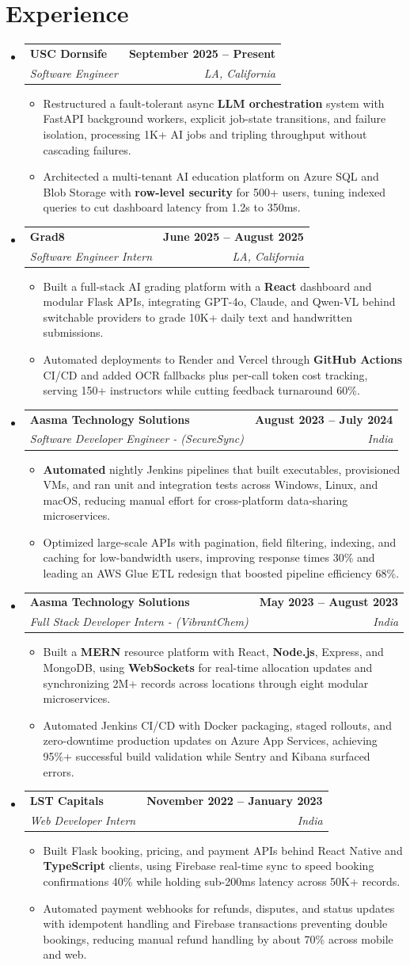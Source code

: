 \documentclass[letterpaper,10pt]{article}
\makeatletter
\newcommand{\itemTail}{\vspace{-4pt}}
\newcommand{\sectionGap}{\vspace{-8pt}}
\newcommand{\roleGap}{\vspace{2pt}}
\newcommand{\resumeItem}[1]{\item\small{{#1 \itemTail}}}
\newcommand{\resumeSubheading}[4]{\vspace{-1pt}\item\begin{tabular*}{1.0\textwidth}[t]{l@{\extracolsep{\fill}}r}\textbf{#1} & \textbf{\small #2} \\\textit{\small#3} & \textit{\small #4} \\\end{tabular*}\vspace{-2pt}}
\newcommand{\resumeSubHeadingListStart}{\begin{itemize}[leftmargin=0.0in, label={}]}
\newcommand{\resumeSubHeadingListEnd}{\end{itemize}}
\newcommand{\resumeItemListStart}{\begin{itemize}[leftmargin=0.15in,label=\textbullet,itemsep=3pt,topsep=0pt,parsep=0pt,partopsep=0pt]}
\newcommand{\resumeItemListEnd}{\end{itemize}\vspace{-4pt}}
\makeatother
\begin{document}
\section{Experience}
\resumeSubHeadingListStart
\resumeSubheading{USC Dornsife}{September 2025 -- Present}{Software Engineer}{LA, California}
\resumeItemListStart
\resumeItem{Restructured a fault-tolerant async \textbf{LLM orchestration} system with FastAPI background workers, explicit job-state transitions, and failure isolation, processing 1K+ AI jobs and tripling throughput without cascading failures.}
\resumeItem{Architected a multi-tenant AI education platform on Azure SQL and Blob Storage with \textbf{row-level security} for 500+ users, tuning indexed queries to cut dashboard latency from 1.2s to 350ms.}
\resumeItemListEnd
\roleGap
\resumeSubheading{Grad8}{June 2025 -- August 2025}{Software Engineer Intern}{LA, California}
\resumeItemListStart
\resumeItem{Built a full-stack AI grading platform with a \textbf{React} dashboard and modular Flask APIs, integrating GPT-4o, Claude, and Qwen-VL behind switchable providers to grade 10K+ daily text and handwritten submissions.}
\resumeItem{Automated deployments to Render and Vercel through \textbf{GitHub Actions} CI/CD and added OCR fallbacks plus per-call token cost tracking, serving 150+ instructors while cutting feedback turnaround 60\%.}
\resumeItemListEnd
\roleGap
\resumeSubheading{Aasma Technology Solutions}{August 2023 -- July 2024}{Software Developer Engineer - (SecureSync)}{India}
\resumeItemListStart
\resumeItem{\textbf{Automated} nightly Jenkins pipelines that built executables, provisioned VMs, and ran unit and integration tests across Windows, Linux, and macOS, reducing manual effort for cross-platform data-sharing microservices.}
\resumeItem{Optimized large-scale APIs with pagination, field filtering, indexing, and caching for low-bandwidth users, improving response times 30\% and leading an AWS Glue ETL redesign that boosted pipeline efficiency 68\%.}
\resumeItemListEnd
\roleGap
\resumeSubheading{Aasma Technology Solutions}{May 2023 -- August 2023}{Full Stack Developer Intern - (VibrantChem)}{India}
\resumeItemListStart
\resumeItem{Built a \textbf{MERN} resource platform with React, \textbf{Node.js}, Express, and MongoDB, using \textbf{WebSockets} for real-time allocation updates and synchronizing 2M+ records across locations through eight modular microservices.}
\resumeItem{Automated Jenkins CI/CD with Docker packaging, staged rollouts, and zero-downtime production updates on Azure App Services, achieving 95\%+ successful build validation while Sentry and Kibana surfaced errors.}
\resumeItemListEnd
\roleGap
\resumeSubheading{LST Capitals}{November 2022 -- January 2023}{Web Developer Intern}{India}
\resumeItemListStart
\resumeItem{Built Flask booking, pricing, and payment APIs behind React Native and \textbf{TypeScript} clients, using Firebase real-time sync to speed booking confirmations 40\% while holding sub-200ms latency across 50K+ records.}
\resumeItem{Automated payment webhooks for refunds, disputes, and status updates with idempotent handling and Firebase transactions preventing double bookings, reducing manual refund handling by about 70\% across mobile and web.}
\resumeItemListEnd
\resumeSubHeadingListEnd
\sectionGap
\end{document}
